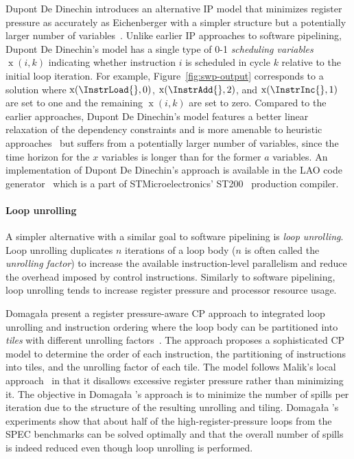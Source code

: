 \documentclass[acmsmall,authorversion,nonacm]{acmart}
\newcommand{\noMathVar}[2]{\operatorname{#1}(#2)}
\newcommand{\var}[2]{$\noMathVar{#1}{#2}$}
\begin{document}
Dupont De Dinechin introduces an alternative IP model that minimizes
register pressure as accurately as Eichenberger \etal{} with a simpler
structure but a potentially larger number of
variables~\cite{DeDinechin2004}.
Unlike earlier IP approaches to software pipelining, Dupont De
Dinechin's model has a single type of 0-1 \emph{scheduling variables}
\var{x}{i,k} indicating whether instruction $i$ is scheduled in cycle
$k$ relative to the initial loop iteration.
For example, Figure~\ref{fig:swp-output} corresponds to a solution
where \var{x}{\InstrLoad{},0}, \var{x}{\InstrAdd{},2}, and
\var{x}{\InstrInc{},1} are set to one and the remaining \var{x}{i,k}
are set to zero.
Compared to the earlier approaches, Dupont De Dinechin's model
features a better linear relaxation of the dependency constraints and
is more amenable to heuristic
approaches~\cite{Blachot2006,DeDinechin2007} but suffers from a
potentially larger number of variables, since the time horizon for the
$x$ variables is longer than for the former $a$ variables.
An implementation of Dupont De Dinechin's approach is available in the
LAO code generator~\cite{DeDinechin2000} which is a part of
STMicroelectronics' ST200~\cite{Faraboschi2000} production compiler.

\paragraph{Loop unrolling}

A simpler alternative with a similar goal to software pipelining is
\emph{loop unrolling}.
Loop unrolling duplicates $n$ iterations of a loop body ($n$ is often
called the \emph{unrolling factor}) to increase the available
instruction-level parallelism and reduce the overhead imposed by
control instructions.
Similarly to software pipelining, loop unrolling tends to increase
register pressure and processor resource usage.

Domaga\l{}a \etal{} present a register pressure-aware CP approach to
integrated loop unrolling and instruction ordering where the loop body
can be partitioned into \emph{tiles} with different unrolling
factors~\cite{Domagala2016}.
The approach proposes a sophisticated CP model to determine the order
of each instruction, the partitioning of instructions into tiles, and
the unrolling factor of each tile.
The model follows Malik's local approach~\cite{Malik2008c} in that it
disallows excessive register pressure rather than minimizing it.
The objective in Domaga\l{}a \etal{}'s approach is to minimize the
number of spills per iteration due to the structure of the resulting
unrolling and tiling.
Domaga\l{}a \etal{}'s experiments show that about half of the
high-register-pressure loops from the SPEC benchmarks can be solved
optimally and that the overall number of spills is indeed reduced even
though loop unrolling is performed.
\end{document}

